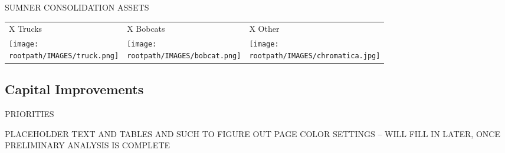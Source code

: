 \textcolor{ccorange}{SUMNER CONSOLIDATION ASSETS}
\begin{table}[H]
\begin{tabular}{m{}m{}m{}}
{\color{ccorange} X Trucks} & {\color{ccorange} X Bobcats} & {\color{ccorange} X Other} \\
\texttt{[image: \\rootpath/IMAGES/truck.png]}                            & \texttt{[image: \\rootpath/IMAGES/bobcat.png]}                             & \texttt{[image: \\rootpath/IMAGES/chromatica.jpg]}                          
\end{tabular}
\end{table}
\pagebreak
\textcolor{ccorange}{\section{Capital Improvements}}

\begin{table}[H]



\end{table}
\pagebreak

\textcolor{ccorange}{PRIORITIES}

PLACEHOLDER TEXT AND TABLES AND SUCH TO FIGURE OUT PAGE COLOR SETTINGS -- WILL FILL IN LATER, ONCE PRELIMINARY ANALYSIS IS COMPLETE
\pagebreak
\pagestyle{plain}
\pagecolor{ccfuschia}
\pagebreak
{}
\pagestyle{fancy}
\fancyhf{}
\renewcommand{\chaptermark}[1]{\markboth{#1}{}}
\fancyfoot[LE,RO]{\thepage}


